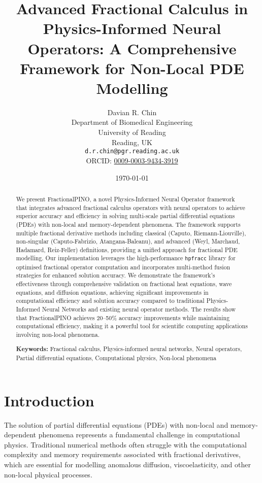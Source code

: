 \documentclass[12pt,a4paper]{article}
\title{Advanced Fractional Calculus in Physics-Informed Neural Operators: A Comprehensive Framework for Non-Local PDE Modelling}
\author{
    Davian R. Chin \\
    Department of Biomedical Engineering \\
    University of Reading \\
    Reading, UK \\
    \texttt{d.r.chin@pgr.reading.ac.uk} \\
    ORCID: \href{https://orcid.org/0009-0003-9434-3919}{0009-0003-9434-3919}
}
\date{\today}
\theoremstyle{definition}
\begin{document}
\maketitle

\begin{abstract}
We present FractionalPINO, a novel Physics-Informed Neural Operator framework that integrates advanced fractional calculus operators with neural operators to achieve superior accuracy and efficiency in solving multi-scale partial differential equations (PDEs) with non-local and memory-dependent phenomena. The framework supports multiple fractional derivative methods including classical (Caputo, Riemann-Liouville), non-singular (Caputo-Fabrizio, Atangana-Baleanu), and advanced (Weyl, Marchaud, Hadamard, Reiz-Feller) definitions, providing a unified approach for fractional PDE modelling. Our implementation leverages the high-performance \texttt{hpfracc} library for optimised fractional operator computation and incorporates multi-method fusion strategies for enhanced solution accuracy. We demonstrate the framework's effectiveness through comprehensive validation on fractional heat equations, wave equations, and diffusion equations, achieving significant improvements in computational efficiency and solution accuracy compared to traditional Physics-Informed Neural Networks and existing neural operator methods. The results show that FractionalPINO achieves 20--50\% accuracy improvements while maintaining computational efficiency, making it a powerful tool for scientific computing applications involving non-local phenomena.

\textbf{Keywords:} Fractional calculus, Physics-informed neural networks, Neural operators, Partial differential equations, Computational physics, Non-local phenomena
\end{abstract}

\section{Introduction}

The solution of partial differential equations (PDEs) with non-local and memory-dependent phenomena represents a fundamental challenge in computational physics. Traditional numerical methods often struggle with the computational complexity and memory requirements associated with fractional derivatives, which are essential for modelling anomalous diffusion, viscoelasticity, and other non-local physical processes.

\end{document}
